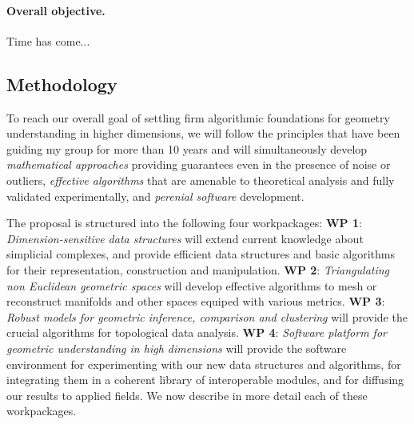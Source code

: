 \paragraph{Overall objective.}
Time has come...





\subsection{Methodology}
To reach our overall goal of settling firm algorithmic foundations for geometry understanding in higher dimensions, we will follow the principles that have been guiding my group for more than 10 years and will simultaneously develop
{\em mathematical approaches} providing guarantees even in the presence of noise or outliers,
{\em effective algorithms} that are amenable to theoretical analysis and fully validated experimentally,
and {\em perenial software} development.

The proposal is structured into the following four workpackages:
{\bf WP 1}:  {\em Dimension-sensitive data  structures} will extend current knowledge about simplicial complexes, and  provide efficient data structures and basic algorithms for their representation, construction and manipulation. 
  {\bf WP 2}:  {\em Triangulating non Euclidean geometric spaces} will develop effective algorithms to mesh or reconstruct manifolds and other spaces equiped with various metrics.   {\bf WP 3}: {\em Robust models for geometric inference, comparison and  clustering} will provide the crucial  algorithms for topological data analysis.
 {\bf WP 4}:  {\em  Software platform for geometric understanding in high dimensions} will provide the software environment for experimenting with our new data structures and algorithms, for integrating them in a coherent library of interoperable modules, and for diffusing our results to applied fields. We now describe in more detail each of these workpackages.


